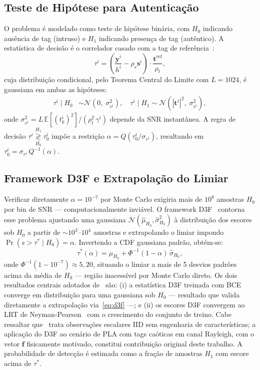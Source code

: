 \documentclass{sbrt}
\begin{document}
\subsection{Teste de Hipótese para Autenticação}\label{sec:hip}

O problema é modelado como teste de hipótese binária, com $H_0$ indicando ausência de tag (intruso) e $H_1$ indicando presença de tag (autêntico). A estatística de decisão é o correlador casado com a tag de referência~\cite{ref_joao}:
\begin{equation}\label{eq:tau}
    \tau^i = \left(\frac{\mathbf{y}^i}{h^i} - \rho_s \mathbf{s}^i\right) \cdot \frac{\mathbf{t}^{\mathrm{ref}}}{\rho_t},
\end{equation}
cuja distribuição condicional, pelo Teorema Central do Limite com $L = 1024$, é gaussiana em ambas as hipóteses:
\begin{align}
    \tau^i \mid H_0 &\sim \mathcal{N}\!\left(0,\; \sigma_{v^i}^2\right),\quad
    \tau^i \mid H_1 \sim \mathcal{N}\!\left(|\mathbf{t}^i|^2,\; \sigma_{v^i}^2\right), \label{eq:dists}
\end{align}
onde $\sigma_{v^i}^2 = L\,\mathbb{E}[(t^i_k)^2]/(\rho_t^2\,\gamma^i)$ depende da SNR instantânea. A regra de decisão $\tau^i \underset{H_0}{\overset{H_1}{\gtrless}} \tau^i_0$ impõe a restrição $\alpha = Q(\tau^i_0/\sigma_{v^i})$, resultando em $\tau^i_0 = \sigma_{v^i}\,Q^{-1}(\alpha)$.

\subsection{Framework D3F e Extrapolação do Limiar}\label{sec:d3f}

Verificar diretamente $\alpha = 10^{-7}$ por Monte Carlo exigiria mais de $10^8$ amostras $H_0$ por bin de SNR — computacionalmente inviável. O framework D3F~\cite{ref_braca} contorna esse problema ajustando uma gaussiana $\mathcal{N}(\hat{\mu}_{H_0}, \hat{\sigma}_{H_0}^2)$ à distribuição dos escores sob $H_0$ a partir de $\sim\!10^3$--$10^4$ amostras e extrapolando o limiar impondo $\Pr(s > \tau^* \mid H_0) = \alpha$. Invertendo a CDF gaussiana padrão, obtém-se:
\begin{equation}\label{eq:d3f}
    \tau^*(\alpha) = \hat{\mu}_{H_0} + \Phi^{-1}(1-\alpha)\,\hat{\sigma}_{H_0},
\end{equation}
onde $\Phi^{-1}(1 - 10^{-7}) \approx 5{,}20$, situando o limiar a mais de 5 desvios padrões acima da média de $H_0$ — região inacessível por Monte Carlo direto. Os dois resultados centrais adotados de~\cite{ref_braca} são: (i) a estatística D3F treinada com BCE converge em distribuição para uma gaussiana sob $H_0$ — resultado que valida diretamente a extrapolação via~\eqref{eq:d3f} —; e (ii) os escores D3F convergem ao LRT de Neyman-Pearson~\cite{ref_poor,ref_veldhuis} com o crescimento do conjunto de treino. Cabe ressaltar que~\cite{ref_braca} trata observações escalares IID sem engenharia de características; a aplicação do D3F ao cenário de PLA com tags caóticas em canal Rayleigh, com o vetor $\mathbf{f}$ fisicamente motivado, constitui contribuição original deste trabalho. A probabilidade de detecção é estimada como a fração de amostras $H_1$ com escore acima de $\tau^*$.
\end{document}
